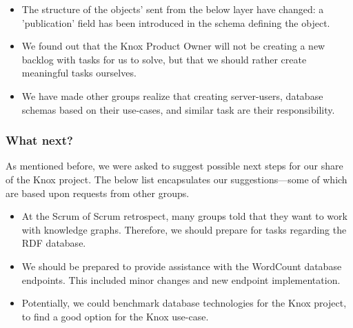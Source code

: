 \begin{itemize}
    \item The structure of the objects' sent from the below layer have changed: a 'publication' field has been introduced in the schema defining the object.
    \item We found out that the Knox Product Owner will not be creating a new backlog with tasks for us to solve, but that we should rather create meaningful tasks ourselves.
    \item We have made other groups realize that creating server-users, database schemas based on their use-cases, and similar task are their responsibility.
\end{itemize}

\subsubsection{What next?}
As mentioned before, we were asked to suggest possible next steps for our share of the Knox project. The below list encapsulates our suggestions---some of which are based upon requests from other groups.

\begin{itemize}
    \item At the Scrum of Scrum retrospect, many groups told that they want to work with knowledge graphs. Therefore, we should prepare for tasks regarding the RDF database.
    \item We should be prepared to provide assistance with the WordCount database endpoints. This included minor changes and new endpoint implementation.
    \item Potentially, we could benchmark database technologies for the Knox project, to find a good option for the Knox use-case.
\end{itemize}